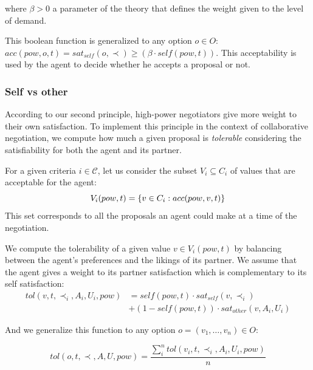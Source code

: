 \documentclass{llncs}
\begin{document}
		\medskip
		where $\beta>0$ a parameter of the theory that defines the weight given to the level of demand.
		
		This boolean function is generalized to any option $o \in O$: $acc(pow,o, t) = sat_{self}(o, \prec) \geq  (\beta \cdot self(pow,t))$. This acceptability is used by the agent to decide whether he accepts a proposal or not.
		
		
		\subsubsection {Self vs other}
		According to our second principle, high-power negotiators give more weight to their own satisfaction. To implement this principle in the context of collaborative negotiation, we compute how much a given proposal is \emph{tolerable} considering the satisfiability for both the agent and its partner.
		
		For a given criteria $i\in\mathcal{C}$, let us consider the subset $V_i\subseteq C_i$ of values that are acceptable for the agent:
		\vspace{-0.5em} 
		\begin{equation}
		V_i(pow,t) = \{ v\in C_i : acc(pow,v,t) \}
		\vspace{-0.5em}
		\end{equation}
		This set corresponds to all the proposals an agent could make at a time of the negotiation.
		
		We compute the tolerability of a given value $v\in V_i(pow,t)$ by balancing between the agent's preferences and the likings of its partner. We assume that the agent gives a weight to its partner satisfaction which is complementary to its self satisfaction:
		\begin{equation}
		\begin{split}
		tol(v, t, \prec_i, A_i, U_i, pow) & = self(pow, t)  \cdot sat_{self}(v, \prec_i) \\
		& +  (1 - self(pow, t)) \cdot sat_{other}(v, A_i, U_i)
		\end{split} 
		\end{equation}
		
		\noindent
		And we generalize this function to any option $o=(v_1,\ldots,v_n) \in O$:
		
		\begin{equation}
		tol(o, t, \prec, A, U, pow) = \frac{ \sum_{i}^{n} tol(v_i, t, \prec_i, A_i, U_i, pow) } {n}
		\end{equation}
		
\end{document}
